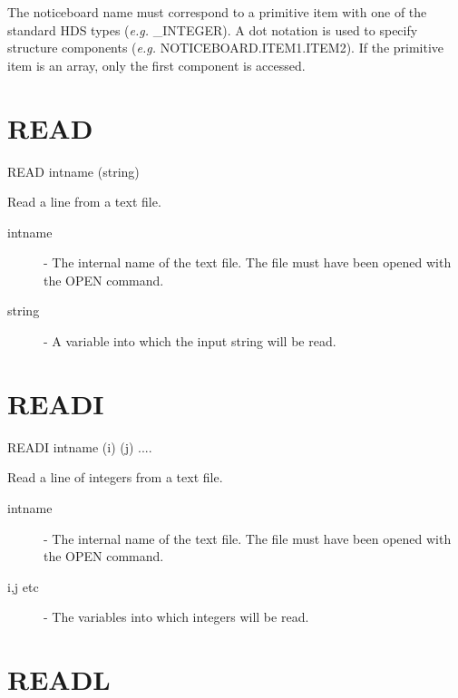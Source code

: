 \documentclass[twoside,11pt]{report}
\newcommand{\xlabel}[1]{}
\begin{document}
The noticeboard name must correspond to a primitive item with one of the
standard HDS types ({\em e.g.} \_INTEGER).
A dot notation is used to specify structure
components ({\em e.g.} NOTICEBOARD.ITEM1.ITEM2).
If the primitive item is an array, only the first component is accessed.


\section{\xlabel{READ}READ\label{READ}}

   READ \hspace{.5cm} intname \hspace{.5cm}  (string)

 Read a line from a text file.
\begin{description}

\item[intname]  -  The internal name of the text file. The file must have
                   been opened with the OPEN command.

\item[string]  -  A variable into which the input string will be read.

\end{description}


\section{\xlabel{READI}READI\label{READI}}


    READI \hspace{.5cm} intname \hspace{.5cm} (i) \hspace{.5cm} (j)  ....

 Read a line of integers from a text file.

\begin{description}

\item[intname]  -  The internal name of the text file. The file must have
                   been opened with the OPEN command.

\item[i,j etc] -  The variables into which integers will be read.

\end{description}

\section{\xlabel{READL}READL\label{READL}}
\end{document}

